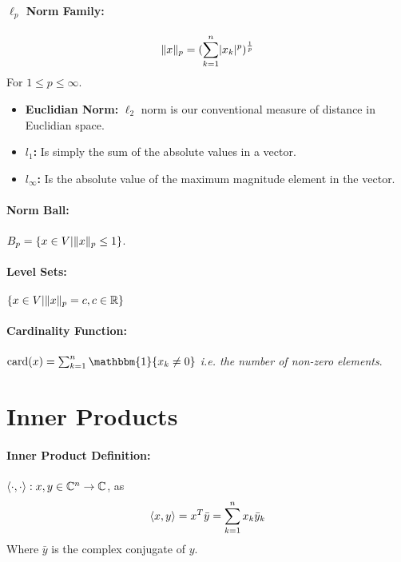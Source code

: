 \documentclass[a4paper,12pt]{report}
\DeclarePairedDelimiter\abs{\lvert}{\rvert}%
\DeclarePairedDelimiter\norm{\lVert}{\rVert}%
\DeclarePairedDelimiter\inpr{\langle}{\rangle}%
\def\reals{\mathbb{R}}
\begin{document}
\paragraph{$\ell_p$ Norm Family: } \begin{equation}
\norm{x}_p = (\sum_{k=1}^{n} \abs{x_k}^p)^{\frac{1}{p}}
\end{equation}
For $1 \leq p \leq \infty$.

\begin{itemize}
\item \textbf{Euclidian Norm: } $\ell_2$ norm is our conventional measure of distance in Euclidian space.
\item \textbf{$l_1$: } Is simply the sum of the absolute values in a vector.
\item \textbf{$l_\infty$: } Is the absolute value of the maximum magnitude element in the vector.
\end{itemize}

\paragraph{Norm Ball: } $B_p = \{x\in V | \norm{x}_p \leq 1\}$.

\paragraph{Level Sets: } $\{x\in V | \norm{x}_p = c, c\in\reals\}$

\paragraph{Cardinality Function: } $\text{card}(x) = \sum_{k=1}^{n} \mathbbm{1}\{x_k \neq 0\}$ \textit{i.e. the number of non-zero elements}.



\section{Inner Products}

\paragraph{Inner Product Definition: } $\inpr{\cdot,\cdot}: x, y\in\mathbb{C}^n \to \mathbb{C}$, as \begin{equation}
\inpr{x, y} = x^T\bar{y} = \sum_{k=1}^{n} x_k \bar{y}_k
\end{equation}
Where $\bar{y}$ is the complex conjugate of $y$.
\end{document}
